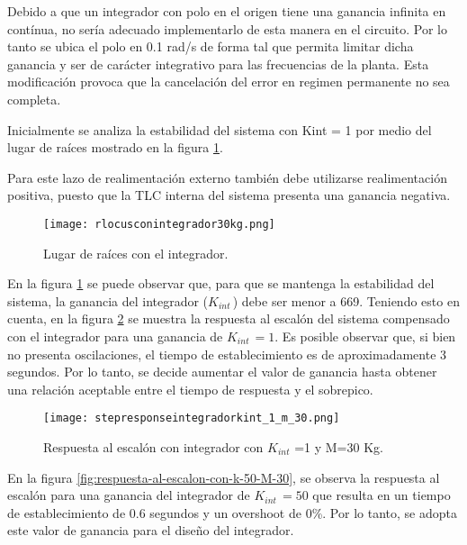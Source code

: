 \noindent Debido a que un integrador con polo en el origen tiene una ganancia infinita en contínua, no sería adecuado implementarlo de esta manera en el circuito. Por lo tanto se ubica el polo en 0.1 rad/s de forma tal que permita limitar dicha ganancia y ser de carácter integrativo para las frecuencias de la planta. Esta modificación provoca que la cancelación del error en regimen permanente no sea completa.


Inicialmente se analiza la estabilidad del sistema con Kint = 1 por medio del lugar de raíces mostrado en la figura \ref{fig:lugar-de-raices-con-integrador-analog}.

\noindent Para este lazo de realimentación externo también debe utilizarse realimentación positiva, puesto que la TLC interna del sistema presenta una ganancia negativa.


\begin{figure}[H]
	\centering
	\texttt{[image: rlocusconintegrador30kg.png]}
	\caption{Lugar de raíces con el integrador.}
	\label{fig:lugar-de-raices-con-integrador-analog}
\end{figure}

\noindent En la figura \ref{fig:lugar-de-raices-con-integrador-analog} se puede observar que, para que se mantenga la estabilidad del sistema, la ganancia del integrador ($K_{int\ }$) debe ser menor a 669. Teniendo esto en cuenta, en la figura \ref{fig:respuesta-al-escalon-con-k-1-M-30-analog} se muestra la respuesta al escal\'{o}n del sistema compensado con el integrador para una ganancia de $K_{int\ }=1$.  Es posible observar que, si bien no presenta oscilaciones, el tiempo de establecimiento es de aproximadamente 3 segundos. Por lo tanto, se decide aumentar el valor de ganancia hasta obtener una relaci\'{o}n aceptable entre el tiempo de respuesta y el sobrepico.

\begin{figure}[H]
	\centering
	\texttt{[image: stepresponseintegradorkint\_1\_m\_30.png]}
	\caption{Respuesta al escalón con integrador con $K_{int}$ =1 y M=30 Kg.}
	\label{fig:respuesta-al-escalon-con-k-1-M-30-analog}
\end{figure}

\noindent En la figura \ref{fig:respuesta-al-escalon-con-k-50-M-30}, se observa la respuesta al escal\'{o}n para una ganancia del integrador de $K_{int\ }=50$ que resulta en un tiempo de establecimiento de 0.6 segundos y un overshoot de 0\%. Por lo tanto, se adopta este valor de ganancia para el dise\~{n}o del integrador.

